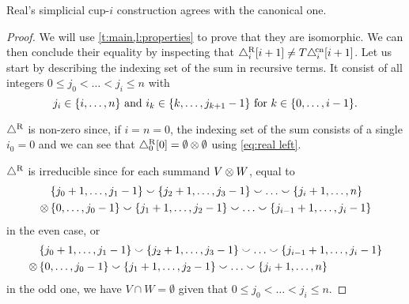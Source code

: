 \begin{theorem}
	Real's simplicial \mbox{cup-$i$} construction agrees with the canonical one.
\end{theorem}

\begin{proof}
	We will use \cref{t:main,l:properties} to prove that they are isomorphic.
	We can then conclude their equality by inspecting that $\triangle^{\mathrm{R}}_i [i+1] \neq T \triangle^{\!\mathrm{cn}}_i [i+1]$.
	Let us start by describing the indexing set of the sum in recursive terms.
	It consist of all integers $0 \leq j_0 < \dots < j_i \leq n$ with
	\begin{equation}\label{eq:indexing set recursively}
		j_i \in \{i,\dots,n\} \text{ and }
		i_k \in \{k,\dots,j_{k+1}-1\} \text{ for } k \in \{0,\dots,i-1\}.
	\end{equation}

	$\triangle^{\mathrm{R}}$ is non-zero since, if $i=n=0$, the indexing set of the sum consists of a single $i_0 = 0$ and we can see that $\triangle^{\mathrm{R}}_0 [0] = \emptyset \otimes \emptyset$ using \cref{eq:real left}.

	$\triangle^{\mathrm{R}}$ is irreducible since for each summand $V \otimes W$, equal to
	\begin{align*}
		&\{j_0+1,\dots,j_1-1\} \union \{j_2+1,\dots,j_3-1\} \union \dots \union \{j_i+1,\dots,n\} \\ \ot \,
		&\{0,\dots,j_0-1\} \union \{j_1+1,\dots,j_2-1\} \union \dots \union \{j_{i-1}+1,\dots,j_i-1\}
	\end{align*}
	in the even case, or
	\begin{align*}
		&\{j_0+1,\dots,j_1-1\} \union \{j_2+1,\dots,j_3-1\} \union \dots \union \{j_{i-1}+1,\dots,j_i-1\} \\ \ot \,
		&\{0,\dots,j_0-1\} \union \{j_1+1,\dots,j_2-1\} \union \dots \union \{j_i+1,\dots,n\}
	\end{align*}
	in the odd one, we have $V \cap W = \emptyset$ given that $0 \leq j_0 < \dots < j_i \leq n$.


\end{proof}
